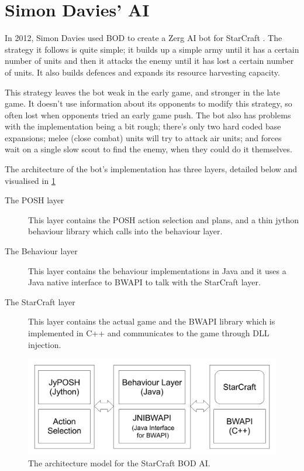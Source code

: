 \documentclass[11pt,openright,a4paper]{report}
\begin{document}
\section{Simon Davies' AI}
In 2012, Simon Davies used BOD to create a Zerg AI bot for StarCraft \cite{davies2012}. The strategy it follows is quite simple; it builds up a simple army until it has a certain number of units and then it attacks the enemy until it has lost a certain number of units. It also builds defences and expands its resource harvesting capacity.

This strategy leaves the bot weak in the early game, and stronger in the late game. It doesn't use information about its opponents to modify this strategy, so often lost when opponents tried an early game push. The bot also has problems with the implementation being a bit rough; there's only two hard coded base expansions; melee (close combat) units will try to attack air units; and forces wait on a single slow scout to find the enemy, when they could do it themselves.

The architecture of the bot's implementation has three layers, detailed below and visualised in \ref{fig:AI-Architecture}
\begin{description}
\item[The POSH layer] This layer contains the POSH action selection and plans, and a thin jython behaviour library which calls into the behaviour layer.
\item[The Behaviour layer] This layer contains the behaviour implementations in Java and it uses a Java native interface to BWAPI \cite{JNIBWAPI} to talk with the StarCraft layer.
\item[The StarCraft layer] This layer contains the actual game and the BWAPI library which is implemented in C++ and communicates to the game through DLL injection.
\end{description}
\begin{figure}[h]
    \centering
    \includegraphics[scale=0.5]{AIArch}
    \caption{The architecture model for the StarCraft BOD AI. \protect\cite{davies2012}}
    \label{fig:AI-Architecture}
\end{figure}
\end{document}
